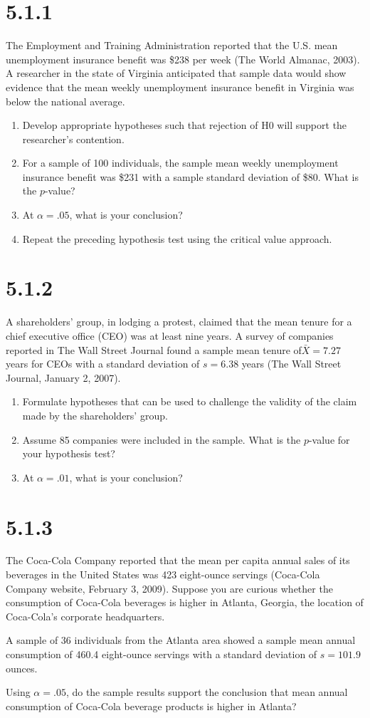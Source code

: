\documentclass{article}
\begin{document}
\section*{5.1.1}
The Employment and Training Administration reported that the U.S. mean unemployment insurance benefit was \$238 per week (The World Almanac, 2003). A researcher in the state of Virginia anticipated that sample data would show evidence that the mean weekly unemployment insurance benefit in Virginia was below the national average.

\begin{enumerate}
  \item Develop appropriate hypotheses such that rejection of H0 will support the researcher’s contention.
  \item For a sample of 100 individuals, the sample mean weekly unemployment insurance benefit was \$231 with a sample standard deviation of \$80. What is the $p$-value?
  \item At $\alpha = .05$, what is your conclusion?
  \item Repeat the preceding hypothesis test using the critical value approach.
\end{enumerate}

\section*{5.1.2}
A shareholders’ group, in lodging a protest, claimed that the mean tenure for a chief executive office (CEO) was at least nine years. A survey of companies reported in The Wall Street Journal found a sample mean tenure of$\bar{X} = 7.27$ years for CEOs with a standard deviation of $s = 6.38$ years (The Wall Street Journal, January 2, 2007).
\begin{enumerate}
  \item Formulate hypotheses that can be used to challenge the validity of the claim made by the shareholders’ group.
  \item Assume 85 companies were included in the sample. What is the $p$-value for your hypothesis test?
  \item At $\alpha = .01$, what is your conclusion?

\end{enumerate}

\section*{5.1.3}
The Coca-Cola Company reported that the mean per capita annual sales of its beverages in the United States was 423 eight-ounce servings (Coca-Cola Company website, February 3, 2009). Suppose you are curious whether the consumption of Coca-Cola beverages is higher in Atlanta, Georgia, the location of Coca-Cola’s corporate headquarters.

A sample of 36 individuals from the Atlanta area showed a sample mean annual consumption of 460.4 eight-ounce servings with a standard deviation of $s = 101.9$ ounces.

Using $\alpha = .05$, do the sample results support the conclusion that mean annual consumption of Coca-Cola beverage products is higher in Atlanta?
\end{document}
